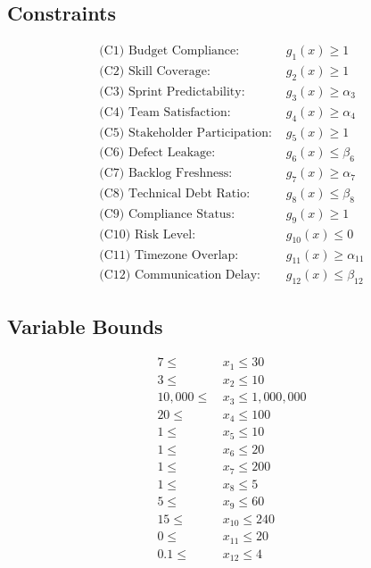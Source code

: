 \documentclass{article}
\begin{document}
\subsection*{Constraints}
\begin{align*}
\text{(C1) Budget Compliance: } &g_1(x) \ge 1 \\
\text{(C2) Skill Coverage: } &g_2(x) \ge 1 \\
\text{(C3) Sprint Predictability: } &g_3(x) \ge \alpha_3 \\
\text{(C4) Team Satisfaction: } &g_4(x) \ge \alpha_4 \\
\text{(C5) Stakeholder Participation: } &g_5(x) \ge 1 \\
\text{(C6) Defect Leakage: } &g_6(x) \le \beta_6 \\
\text{(C7) Backlog Freshness: } &g_7(x) \ge \alpha_7 \\
\text{(C8) Technical Debt Ratio: } &g_8(x) \le \beta_8 \\
\text{(C9) Compliance Status: } &g_9(x) \ge 1 \\
\text{(C10) Risk Level: } &g_{10}(x) \le 0 \\
\text{(C11) Timezone Overlap: } &g_{11}(x) \ge \alpha_{11} \\
\text{(C12) Communication Delay: } &g_{12}(x) \le \beta_{12}
\end{align*}

\subsection*{Variable Bounds}
\[
\begin{aligned}
7 \le &\, x_1 \le 30 \\
3 \le &\, x_2 \le 10 \\
10{,}000 \le &\, x_3 \le 1{,}000{,}000 \\
20 \le &\, x_4 \le 100 \\
1 \le &\, x_5 \le 10 \\
1 \le &\, x_6 \le 20 \\
1 \le &\, x_7 \le 200 \\
1 \le &\, x_8 \le 5 \\
5 \le &\, x_9 \le 60 \\
15 \le &\, x_{10} \le 240 \\
0 \le &\, x_{11} \le 20 \\
0.1 \le &\, x_{12} \le 4
\end{aligned}
\]
\end{document}
